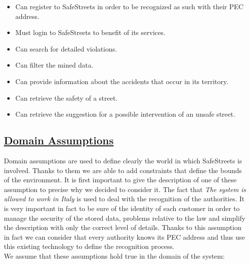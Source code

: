 \begin{itemize}
\begin{itemize}
				\item Can register to SafeStreets in order to be recognized as such with their PEC address.
				\item Must login to SafeStreets to benefit of its services.
				\item Can search for detailed violations.
				\item Can filter the mined data.
				\item Can provide information about the accidents that occur in its territory.
				\item Can retrieve the safety of a street.
				\item Can retrieve the suggestion for a possible intervention of an unsafe street.
			\end{itemize}
	\end{itemize}
	
\subsection[Domain Assumptions]{\hyperlink{toc}{Domain Assumptions}}
	\label{sec:domainAssumptions}
	Domain assumptions are used to define clearly the world in which SafeStreets is involved. Thanks to them we are able to add constraints that define the bounds of the environment. It is first important to give the description of one of these assumption to precise why we decided to consider it. The fact that \emph{The system is allowed to work in Italy} is used to deal with the recognition of the authorities. It is very important in fact to be sure of the identity of each customer in order to manage the security of the stored data, problems relative to the law and simplify the description with only the correct level of details. Thanks to this assumption in fact we can consider that every authority knows its PEC address and thus use this existing technology to define the recognition process. \\
	
	We assume that these assumptions hold true in the domain of the system:
		
